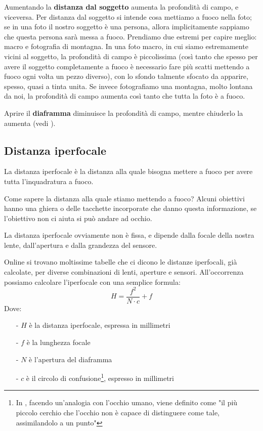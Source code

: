 Aumentando la \textbf{distanza dal soggetto} aumenta la profondità di campo, e viceversa.\newline
Per distanza dal soggetto si intende cosa mettiamo a fuoco nella foto; se in una foto il nostro soggetto è una persona, allora implicitamente sappiamo che questa persona sarà messa a fuoco.
Prendiamo due estremi per capire meglio: macro e fotografia di montagna. In una foto macro, in cui siamo estremamente vicini al soggetto, la profondità di campo è piccolissima (così tanto che spesso per avere il soggetto completamente a fuoco è necessario fare più scatti mettendo a fuoco ogni volta un pezzo diverso), con lo sfondo talmente sfocato da apparire, spesso, quasi a tinta unita. Se invece fotografiamo una montagna, molto lontana da noi, la profondità di campo aumenta così tanto che tutta la foto è a fuoco.

Aprire il \textbf{diaframma} diminuisce la profondità di campo, mentre chiuderlo la aumenta (vedi ).


\subsection{Distanza iperfocale} \label{subsec:iperfocale}
La distanza iperfocale è la distanza alla quale bisogna mettere a fuoco per avere tutta l'inquadratura a fuoco.

Come sapere la distanza alla quale stiamo mettendo a fuoco? Alcuni obiettivi hanno una ghiera o delle tacchette incorporate che danno questa informazione, se l'obiettivo non ci aiuta si può andare ad occhio.

La distanza iperfocale ovviamente non è fissa, e dipende dalla focale della nostra lente, dall'apertura e dalla grandezza del sensore.

Online si trovano moltissime tabelle che ci dicono le distanze iperfocali, già calcolate, per diverse combinazioni di lenti, aperture e sensori. All'occorrenza possiamo calcolare l'iperfocale con una semplice formula:
\[ H = \dfrac{f^2}{N \cdot c} + f \]
Dove:
\begin{itemize}
    \item[-] $H$ è la distanza iperfocale, espressa in millimetri
    \item[-] $f$ è la lunghezza focale
    \item[-] $N$ è l'apertura del diaframma
    \item[-] $c$ è il circolo di confusione\footnote{
        In \cite{Fodde2020-xh}, facendo un'analogia con l'occhio umano, viene definito come "il più piccolo cerchio che l'occhio non è capace di distinguere come tale, assimilandolo a un punto"
    }, espresso in millimetri
\end{itemize}

